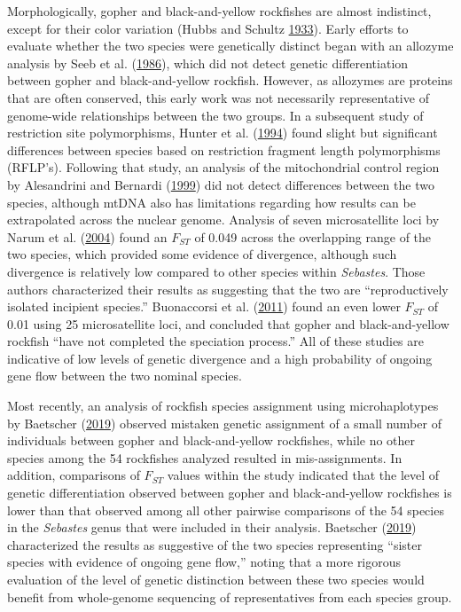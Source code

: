\documentclass[12pt,]{article}
\begin{document}
Morphologically, gopher and black-and-yellow rockfishes are almost
indistinct, except for their color variation (Hubbs and Schultz
\protect\hyperlink{ref-Hubbs1933}{1933}). Early efforts to evaluate
whether the two species were genetically distinct began with an allozyme
analysis by Seeb et al. (\protect\hyperlink{ref-Seeb1986}{1986}), which
did not detect genetic differentiation between gopher and
black-and-yellow rockfish. However, as allozymes are proteins that are
often conserved, this early work was not necessarily representative of
genome-wide relationships between the two groups. In a subsequent study
of restriction site polymorphisms, Hunter et al.
(\protect\hyperlink{ref-Hunter1994}{1994}) found slight but significant
differences between species based on restriction fragment length
polymorphisms (RFLP's). Following that study, an analysis of the
mitochondrial control region by Alesandrini and Bernardi
(\protect\hyperlink{ref-Alesandrini1999}{1999}) did not detect
differences between the two species, although mtDNA also has limitations
regarding how results can be extrapolated across the nuclear genome.
Analysis of seven microsatellite loci by Narum et al.
(\protect\hyperlink{ref-Narum2004}{2004}) found an \(F_{ST}\) of 0.049
across the overlapping range of the two species, which provided some
evidence of divergence, although such divergence is relatively low
compared to other species within \emph{Sebastes}. Those authors
characterized their results as suggesting that the two are
``reproductively isolated incipient species.'' Buonaccorsi et al.
(\protect\hyperlink{ref-Buonaccorsi2011}{2011}) found an even lower
\(F_{ST}\) of 0.01 using 25 microsatellite loci, and concluded that
gopher and black-and-yellow rockfish ``have not completed the speciation
process.'' All of these studies are indicative of low levels of genetic
divergence and a high probability of ongoing gene flow between the two
nominal species.

Most recently, an analysis of rockfish species assignment using
microhaplotypes by Baetscher
(\protect\hyperlink{ref-Baetscher2019}{2019}) observed mistaken genetic
assignment of a small number of individuals between gopher and
black-and-yellow rockfishes, while no other species among the 54
rockfishes analyzed resulted in mis-assignments. In addition,
comparisons of \(F_{ST}\) values within the study indicated that the
level of genetic differentiation observed between gopher and
black-and-yellow rockfishes is lower than that observed among all other
pairwise comparisons of the 54 species in the \emph{Sebastes} genus that
were included in their analysis. Baetscher
(\protect\hyperlink{ref-Baetscher2019}{2019}) characterized the results
as suggestive of the two species representing ``sister species with
evidence of ongoing gene flow,'' noting that a more rigorous evaluation
of the level of genetic distinction between these two species would
benefit from whole-genome sequencing of representatives from each
species group.
\end{document}
